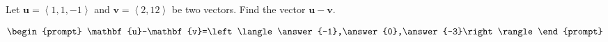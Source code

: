 \documentclass{ximera}
\author{Gregory Hartman \and Matthew Carr}
\begin{document}
\begin{exercise}




Let $\mathbf{u}=\left\langle1,1,-1\right\rangle$ and $\mathbf{v}=\left\langle2,12\right\rangle$ be two vectors. Find the vector $\mathbf{u}-\mathbf{v}$.

\[
\begin{prompt}
\mathbf{u}-\mathbf{v}=\left\langle\answer{-1},\answer{0},\answer{-3}\right\rangle
\end{prompt}
\]

\end{exercise}
\end{document}
